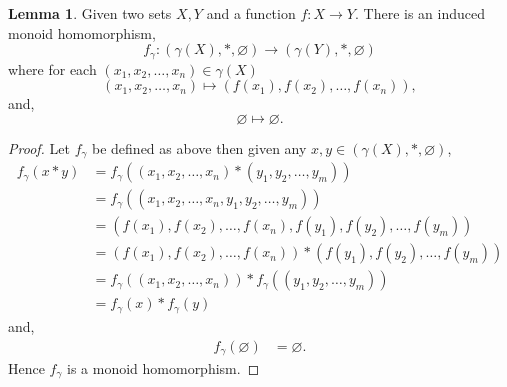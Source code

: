 \documentclass[11pt,a4paper]{article}
\theoremstyle{definition}
\newtheorem{lemma}[thm]{Lemma}
\numberwithin{equation}{section}
\begin{document}
\begin{lemma}
Given two sets $X,Y$ and a function $f:X\rightarrow Y$. There is an induced monoid homomorphism, 
\[f_{\gamma}:(\gamma(X),*,\varnothing)\rightarrow(\gamma(Y),*,\varnothing)\]
        where for each $(x_{1},x_{2},\dots,x_{n}) \in\gamma(X)$
    \[ (x_{1},x_{2},\dots,x_{n})  \mapsto (f(x_{1}),f(x_{2}),\dots,f(x_{n})),\]
    and, \[\varnothing \mapsto \varnothing.\]
\end{lemma}
\begin{proof}
Let $f_{\gamma}$ be defined as above then given any $x,y\in (\gamma(X),*,\varnothing)$,
    \begin{align*}
        f_{\gamma}(x*y) &= f_{\gamma}((x_{1},x_{2},\dots,x_{n})*(y_{1},y_{2},\dots,y_{m})) \\
        &= f_{\gamma}((x_{1},x_{2},\dots,x_{n},y_{1},y_{2},\dots,y_{m}))\\
        &= (f(x_{1}),f(x_{2}),\dots,f(x_{n}),f(y_{1}),f(y_{2}),\dots,f(y_{m}))\\
        &= (f(x_{1}),f(x_{2}),\dots,f(x_{n}))*(f(y_{1}),f(y_{2}),\dots,f(y_{m}))\\
        &= f_{\gamma}((x_{1},x_{2},\dots,x_{n}))*f_{\gamma}((y_{1},y_{2},\dots,y_{m}))\\
        &= f_{\gamma}(x)*f_{\gamma}(y)
    \end{align*}
    and,
    \begin{align*}
        f_{\gamma}(\varnothing) &= \varnothing.
    \end{align*}
    Hence $f_{\gamma}$ is a monoid homomorphism.
\end{proof}
\end{document}
